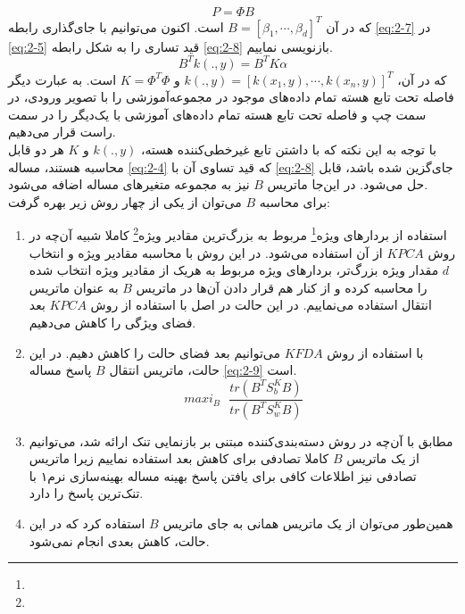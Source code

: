 \documentclass[12pt,twocolumn]{article}
\newcommand{\enfootnote}[1]{\footnote{\lr{#1}}}
\begin{document}
\begin{equation}
P = \Phi B
\label{eq:2-7}
\end{equation}
 که در آن $B = [\beta_1, \cdots, \beta_d]^T$ است. اکنون می‌توانیم با جای‌گذاری رابطه \eqref{eq:2-7} در \eqref{eq:2-5} قید تساری را به شکل رابطه \eqref{eq:2-8} بازنویسی نماییم.
 \begin{equation}
 B^Tk(.,y) = B^TK\alpha
 \label{eq:2-8}
 \end{equation}
 که در آن، $k(.,y) = [k(x_1, y), \cdots, k(x_n,y)]^T$ و $K = \Phi^T\Phi$ است. به عبارت دیگر فاصله تحت تابع هسته تمام داده‌های موجود در مجموعه‌آموزشی را با تصویر ورودی، در سمت چپ و فاصله تحت تابع هسته تمام داده‌های آموزشی با یک‌دیگر را در سمت راست قرار می‌دهیم.
 \\
 با توجه به این نکته که با داشتن تابع غیرخطی‌کننده هسته، $k(.,y)$ و $K$ هر دو قابل محاسبه هستند، مساله \eqref{eq:2-4} که قید تساوی آن با \eqref{eq:2-8} جای‌گزین شده باشد، قابل حل می‌شود. در این‌جا ماتریس $B$ نیز به مجموعه متغیرهای مساله اضافه می‌شود.
 \\
  برای محاسبه $B$ می‌توان از یکی از چهار روش زیر بهره گرفت:
  \begin{enumerate}
  \item استفاده از بردارهای ویژه\enfootnote{Eigenvectors} مربوط به بزرگ‌ترین مقادیر ویژه‌\enfootnote{Eigenvalues} کاملا شبیه آن‌چه در روش $KPCA$ از آن استفاده می‌شود. در این روش با محاسبه مقادیر ویژه و انتخاب $d$ مقدار ویژه بزرگ‌تر، بردارهای ویژه مربوط به هریک از مقادیر ویژه انتخاب شده را محاسبه کرده و از کنار هم قرار دادن آن‌ها در ماتریس $B$ به عنوان ماتریس انتقال استفاده می‌نماییم. در این حالت در اصل با استفاده از روش $KPCA$ بعد فضای ويژگی را کاهش می‌دهیم.
  \item با استفاده از روش $KFDA$ می‌توانیم بعد فضای حالت را کاهش دهیم. در این حالت، ماتریس انتقال $B$ پاسخ مساله \eqref{eq:2-9} است.
  \begin{equation}
  maxi_B  \> \> \> \frac{tr(B^TS_b^KB)}{tr(B^TS_w^KB)}
\label{eq:2-9}
  \end{equation}

  \item مطابق با آن‌چه در روش دسته‌بندی‌کننده مبتنی بر بازنمایی تنک ارائه شد، می‌توانیم از یک ماتریس $B$ کاملا تصادفی برای کاهش بعد استفاده نماییم زیرا ماتریس تصادفی نیز اطلاعات کافی برای یافتن پاسخ بهینه مساله بهینه‌سازی نرم۱ با تنک‌ترین پاسخ را دارد. 
  \item همین‌طور می‌توان از یک ماتریس همانی به جای ماتریس $B$ استفاده کرد که در این حالت، کاهش بعدی انجام نمی‌شود. 
  \end{enumerate}
  
\end{document}
